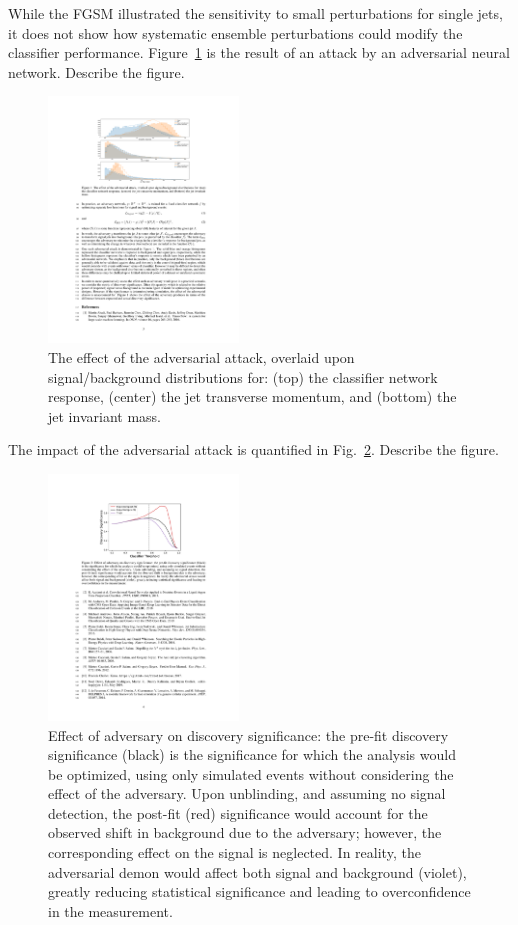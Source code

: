 \documentclass[reprint,nofootinbib,...]{revtex4-1}
\begin{document}
While the FGSM illustrated the sensitivity to small perturbations for single jets, it does not show how systematic ensemble perturbations could modify the classifier performance.  Figure~\ref{fig:method2} is the result of an attack by an adversarial neural network.  Describe the figure. 

\begin{figure}[h!]
\centering
\includegraphics[width=0.45\textwidth]{figures/MethodBFig2.pdf}
\caption{The effect of the adversarial attack, overlaid upon signal/background distributions for: (top) the classifier network response, (center) the jet transverse momentum, and (bottom) the jet invariant mass. }
\label{fig:method2}
\end{figure}

The impact of the adversarial attack is quantified in Fig.~\ref{fig:method2b}.  Describe the figure. 

\begin{figure}[h!]
\centering
\includegraphics[width=0.45\textwidth]{figures/MethodBFig1.pdf}
\caption{Effect of adversary on discovery significance: the pre-fit discovery significance (black) is the significance for which the analysis would be optimized, using only simulated events without considering the effect of the adversary. Upon unblinding, and assuming no signal detection, the post-fit (red) significance would account for the observed shift in background due to the adversary; however, the corresponding effect on the signal is neglected. In reality, the adversarial demon would affect both signal and background (violet), greatly reducing statistical significance and leading to overconfidence in the measurement. }
\label{fig:method2b}
\end{figure}
\end{document}
